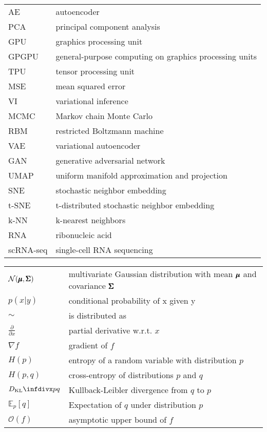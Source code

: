 \begin{tabular}[h]{@{} p{} p{} @{}}
AE        & autoencoder \\
PCA       & principal component analysis \\
GPU       & graphics processing unit \\
GPGPU     & general-purpose computing on graphics processing units \\
TPU       & tensor processing unit \\
MSE       & mean squared error \\
VI        & variational inference \\
MCMC      & Markov chain Monte Carlo \\
RBM       & restricted Boltzmann machine \\
VAE       & variational autoencoder \\
GAN       & generative adversarial network \\
UMAP      & uniform manifold approximation and projection \\
SNE       & stochastic neighbor embedding \\
t-SNE     & t-distributed stochastic neighbor embedding \\
k-NN      & k-nearest neighbors \\
RNA       & ribonucleic acid \\
scRNA-seq & single-cell RNA sequencing
\end{tabular}

\begin{tabular}[h]{@{} p{} p{} @{}}
$\mathcal{N}(\pmb{\mu}, \pmb{\Sigma})$  & multivariate Gaussian distribution with mean $\pmb{\mu}$ and covariance $\pmb{\Sigma}$ \\
$p(x \vert y)$                & conditional probability of x given y \\
$\sim$                        & is distributed as \\
$\frac{\partial}{\partial x}$ & partial derivative w.r.t. $x$ \\
$\nabla f$                    & gradient of $f$ \\
$H(p)$                        & entropy of a random variable with distribution $p$ \\
$H(p,q)$                      & cross-entropy of distributions $p$ and $q$ \\
$\dkl{p}{q}$                  & Kullback-Leibler divergence from $q$ to $p$ \\
$\mathbb{E}_{p}[q]$           & Expectation of $q$ under distribution $p$ \\
$\mathcal{O}(f)$              & asymptotic upper bound of $f$ \\
\end{tabular}
